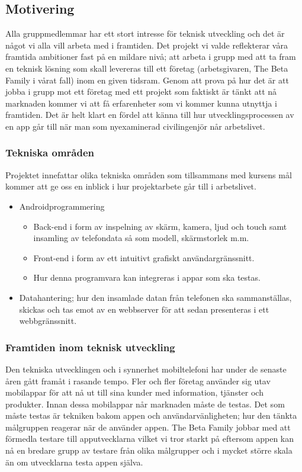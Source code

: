 \subsection{Motivering}
Alla gruppmedlemmar har ett stort intresse för teknisk utveckling och det är något vi alla vill arbeta med i framtiden. Det projekt vi valde reflekterar våra framtida ambitioner fast på en mildare nivå; att arbeta i grupp med att ta fram en teknisk lösning som skall levereras till ett företag (arbetsgivaren, The Beta Family i vårat fall) inom en given tidsram. Genom att prova på hur det är att jobba i grupp mot ett företag med ett projekt som faktiskt är tänkt att nå marknaden kommer vi att få erfarenheter som vi kommer kunna utnyttja i framtiden. Det är helt klart en fördel att känna till hur utvecklingsprocessen av en app går till när man som nyexaminerad civilingenjör når arbetslivet.

\subsubsection{Tekniska områden}

Projektet innefattar olika tekniska områden som tillsammans med kursens mål kommer att ge oss en inblick i hur projektarbete går till i arbetslivet. 
\begin{itemize}
	\item Androidprogrammering
	\begin{itemize}
		\item Back-end i form av inspelning av skärm, kamera, ljud och touch samt insamling av telefondata så som modell, skärmstorlek m.m.
		\item Front-end i form av ett intuitivt grafiskt användargränssnitt.
		\item Hur denna programvara kan integreras i appar som ska testas.
	\end{itemize}
	\item Datahantering; hur den insamlade datan från telefonen ska sammanställas, skickas och tas emot av en webbserver för att sedan presenteras i ett webbgränssnitt.
\end{itemize}

\subsubsection{Framtiden inom teknisk utveckling}
Den tekniska utvecklingen och i synnerhet mobiltelefoni har under de senaste åren gått framåt i rasande tempo. Fler och fler företag använder sig utav mobilappar för att nå ut till sina kunder med information, tjänster och produkter. Innan dessa mobilappar når marknaden måste de testas. Det som måste testas är tekniken bakom appen och användarvänligheten; hur den tänkta målgruppen reagerar när de använder appen. The Beta Family jobbar med att förmedla testare till apputvecklarna vilket vi tror starkt på eftersom appen kan nå en bredare grupp av testare från olika målgrupper och i mycket större skala än om utvecklarna testa appen själva.
